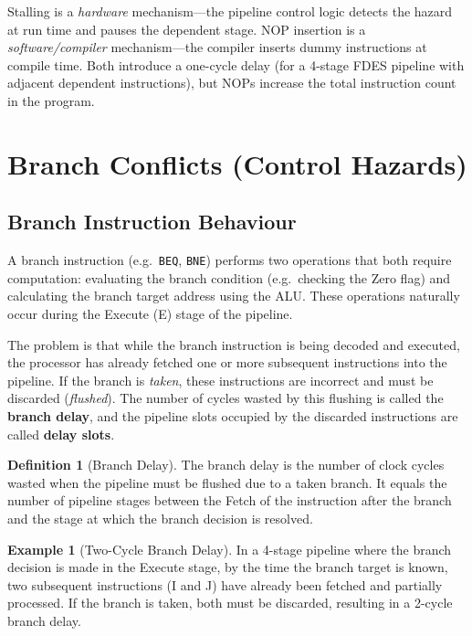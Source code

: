 \documentclass[11pt, a4paper, notitlepage]{report}
\theoremstyle{definition}
\newtheorem{definition}[theorem]{Definition}
\theoremstyle{remark}
\theoremstyle{definition}
\newtheorem{example}[theorem]{Example}
\begin{document}
\begin{warning}[title={Warning: Stall vs.\ NOP}]
  Stalling is a \emph{hardware} mechanism---the pipeline control logic detects the hazard at run time and pauses the dependent stage. NOP insertion is a \emph{software/compiler} mechanism---the compiler inserts dummy instructions at compile time. Both introduce a one-cycle delay (for a 4-stage FDES pipeline with adjacent dependent instructions), but NOPs increase the total instruction count in the program.
\end{warning}

\section{Branch Conflicts (Control Hazards)}
\label{sec:branch-conflict}

\subsection{Branch Instruction Behaviour}
\label{sec:branch-behaviour}

A branch instruction (e.g.\ \texttt{BEQ}, \texttt{BNE}) performs two operations that both require computation: evaluating the branch condition (e.g.\ checking the Zero flag) and calculating the branch target address using the ALU. These operations naturally occur during the Execute (E) stage of the pipeline.

The problem is that while the branch instruction is being decoded and executed, the processor has already fetched one or more subsequent instructions into the pipeline. If the branch is \emph{taken}, these instructions are incorrect and must be discarded (\emph{flushed}). The number of cycles wasted by this flushing is called the \textbf{branch delay}, and the pipeline slots occupied by the discarded instructions are called \textbf{delay slots}.

\begin{definition}[Branch Delay]
\label{def:branch-delay}
  The branch delay is the number of clock cycles wasted when the pipeline must be flushed due to a taken branch. It equals the number of pipeline stages between the Fetch of the instruction after the branch and the stage at which the branch decision is resolved.
\end{definition}

\begin{example}[Two-Cycle Branch Delay]
\label{ex:branch-delay}
In a 4-stage pipeline where the branch decision is made in the Execute stage, by the time the branch target is known, two subsequent instructions (I and J) have already been fetched and partially processed. If the branch is taken, both must be discarded, resulting in a 2-cycle branch delay.
\end{example}
\end{document}
